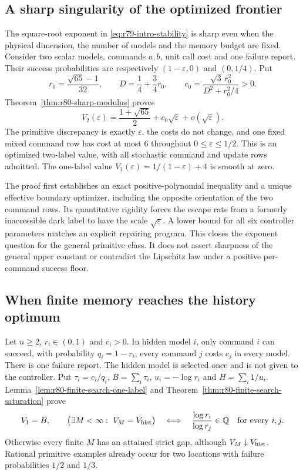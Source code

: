 \subsection*{A sharp singularity of the optimized frontier}

The square-root exponent in \eqref{eq:r79-intro-stability} is sharp even
when the physical dimension, the number of models and the memory budget
are fixed.  Consider two scalar models, commands $a,b$, unit call cost
and one failure report.  Their success probabilities are respectively
$(1-\varepsilon,0)$ and $(0,1/4)$.  Put
\[
 r_0=\frac{\sqrt{65}-1}{32},\qquad
 D=\frac14+\frac34r_0,\qquad
 c_0=\frac{\sqrt3\,r_0^2}{D^2+r_0^2/4}>0.
\]
Theorem~\ref{thm:r80-sharp-modulus} proves
\begin{equation}\label{eq:r80-intro-sharp}
 V_2(\varepsilon)=\frac{1+\sqrt{65}}2
                    +c_0\sqrt\varepsilon+o(\sqrt\varepsilon).
\end{equation}
The primitive discrepancy is exactly $\varepsilon$, the costs do not
change, and one fixed mixed command row has cost at most $6$ throughout
$0\le\varepsilon\le1/2$.  This is an optimized two-label value, with
all stochastic command and update rows admitted.  The one-label value
$V_1(\varepsilon)=1/(1-\varepsilon)+4$ is smooth at zero.

The proof first establishes an exact positive-polynomial inequality
and a unique effective boundary optimizer, including the opposite
orientation of the two command rows.  Its quantitative rigidity forces
the escape rate from a formerly inaccessible dark label to have the
scale $\sqrt\varepsilon$.  A lower bound for all six controller
parameters matches an explicit repairing program.  This closes the
exponent question for the general primitive class.  It does not assert
sharpness of the general upper constant or contradict the Lipschitz law
under a positive per-command success floor.

\subsection*{When finite memory reaches the history optimum}

Let $n\ge2$, $r_i\in(0,1)$ and $c_i>0$.  In hidden model $i$,
only command $i$ can succeed, with probability $q_i=1-r_i$; every
command $j$ costs $c_j$ in every model.  There is one failure report.
The hidden model is selected once and is not given to the controller.
Put $\tau_i=c_i/q_i$, $B=\sum_i\tau_i$, $u_i=-\log r_i$ and
$H=\sum_i1/u_i$.  Lemma~\ref{lem:r80-finite-search-one-label} and
Theorem~\ref{thm:r80-finite-search-saturation} prove
\begin{equation}\label{eq:r80-intro-saturation}
 V_1=B,\qquad
 \bigl(\exists M<\infty:\ V_M=V_{\rm hist}\bigr)
 \quad\Longleftrightarrow\quad
 \frac{\log r_i}{\log r_j}\in\mathbb Q\quad\text{for every }i,j.
\end{equation}
Otherwise every finite $M$ has an attained strict gap, although
$V_M\downarrow V_{\rm hist}$.  Rational primitive examples already
occur for two locations with failure probabilities $1/2$ and $1/3$.

